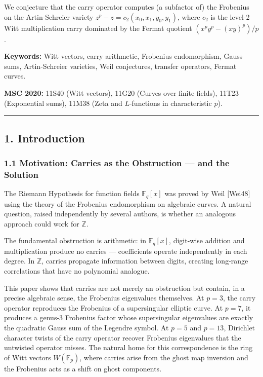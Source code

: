 \documentclass[
  11pt,
]{article}
\begin{document}
We conjecture that the carry operator computes (a subfactor of) the Frobenius on
the Artin-Schreier variety \(z^p - z = c_2(x_0, x_1, y_0, y_1)\), where \(c_2\)
is the level-2 Witt multiplication carry dominated by the Fermat quotient
\((x^p y^p - (xy)^p)/p\).

\textbf{Keywords:} Witt vectors, carry arithmetic, Frobenius endomorphism, Gauss
sums, Artin-Schreier varieties, Weil conjectures, transfer operators, Fermat
curves.

\textbf{MSC 2020:} 11S40 (Witt vectors), 11G20 (Curves over finite fields),
11T23 (Exponential sums), 11M38 (Zeta and \(L\)-functions in characteristic
\(p\)).

\begin{center}\rule{0.5\linewidth}{0.5pt}\end{center}

\newpage

\subsection{1. Introduction}\label{introduction}

\subsubsection{1.1 Motivation: Carries as the Obstruction --- and the
Solution}\label{motivation-carries-as-the-obstruction-and-the-solution}

The Riemann Hypothesis for function fields \(\mathbb{F}_q[x]\) was proved by
Weil {[}Wei48{]} using the theory of the Frobenius endomorphism on algebraic
curves. A natural question, raised independently by several authors, is whether
an analogous approach could work for \(\mathbb{Z}\).

The fundamental obstruction is arithmetic: in \(\mathbb{F}_q[x]\), digit-wise
addition and multiplication produce no carries --- coefficients operate
independently in each degree. In \(\mathbb{Z}\), carries propagate information
between digits, creating long-range correlations that have no polynomial
analogue.

This paper shows that carries are not merely an obstruction but contain, in a
precise algebraic sense, the Frobenius eigenvalues themselves. At \(p = 3\), the
carry operator reproduces the Frobenius of a supersingular elliptic curve. At
\(p = 7\), it produces a genus-3 Frobenius factor whose supersingular
eigenvalues are exactly the quadratic Gauss sum of the Legendre symbol. At
\(p = 5\) and \(p = 13\), Dirichlet character twists of the carry operator
recover Frobenius eigenvalues that the untwisted operator misses. The natural
home for this correspondence is the ring of Witt vectors \(W(\mathbb{F}_p)\),
where carries arise from the ghost map inversion and the Frobenius acts as a
shift on ghost components.
\end{document}
